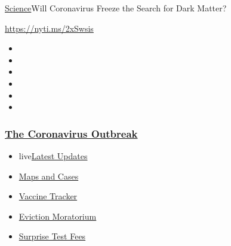 \href{/section/science}{Science}\textbar{}Will Coronavirus Freeze the
Search for Dark Matter?

\url{https://nyti.ms/2xSwsis}

\begin{itemize}
\item
\item
\item
\item
\item
\item
\end{itemize}

\hypertarget{the-coronavirus-outbreak}{%
\subsubsection{\texorpdfstring{\href{https://www.nytimes3xbfgragh.onion/news-event/coronavirus?name=styln-coronavirus-national\&region=TOP_BANNER\&block=storyline_menu_recirc\&action=click\&pgtype=Article\&impression_id=a315c0f0-f2ac-11ea-987f-e1331429ff8f\&variant=undefined}{The
Coronavirus
Outbreak}}{The Coronavirus Outbreak}}\label{the-coronavirus-outbreak}}

\begin{itemize}
\tightlist
\item
  live\href{https://www.nytimes3xbfgragh.onion/2020/09/09/world/covid-19-coronavirus.html?name=styln-coronavirus-national\&region=TOP_BANNER\&block=storyline_menu_recirc\&action=click\&pgtype=Article\&impression_id=a315c0f1-f2ac-11ea-987f-e1331429ff8f\&variant=undefined}{Latest
  Updates}
\item
  \href{https://www.nytimes3xbfgragh.onion/interactive/2020/us/coronavirus-us-cases.html?name=styln-coronavirus-national\&region=TOP_BANNER\&block=storyline_menu_recirc\&action=click\&pgtype=Article\&impression_id=a315c0f2-f2ac-11ea-987f-e1331429ff8f\&variant=undefined}{Maps
  and Cases}
\item
  \href{https://www.nytimes3xbfgragh.onion/interactive/2020/science/coronavirus-vaccine-tracker.html?name=styln-coronavirus-national\&region=TOP_BANNER\&block=storyline_menu_recirc\&action=click\&pgtype=Article\&impression_id=a315c0f3-f2ac-11ea-987f-e1331429ff8f\&variant=undefined}{Vaccine
  Tracker}
\item
  \href{https://www.nytimes3xbfgragh.onion/2020/09/02/your-money/eviction-moratorium-covid.html?name=styln-coronavirus-national\&region=TOP_BANNER\&block=storyline_menu_recirc\&action=click\&pgtype=Article\&impression_id=a315e800-f2ac-11ea-987f-e1331429ff8f\&variant=undefined}{Eviction
  Moratorium}
\item
  \href{https://www.nytimes3xbfgragh.onion/2020/09/09/upshot/coronavirus-surprise-test-fees.html?name=styln-coronavirus-national\&region=TOP_BANNER\&block=storyline_menu_recirc\&action=click\&pgtype=Article\&impression_id=a315e801-f2ac-11ea-987f-e1331429ff8f\&variant=undefined}{Surprise
  Test Fees}
\end{itemize}

